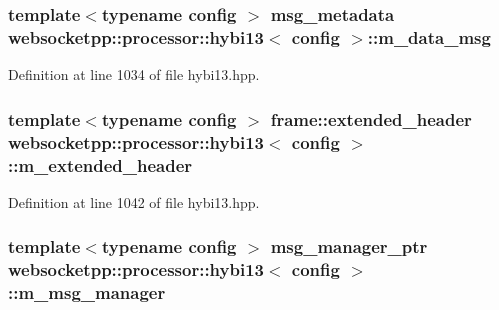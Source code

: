 \hypertarget{classwebsocketpp_1_1processor_1_1hybi13_a7ace361da2e05291aeb029956f20aee3}{}
\subsubsection[{m\+\_\+data\+\_\+msg}]{\setlength{\rightskip}{0pt plus 5cm}template$<$typename config $>$ {\bf msg\+\_\+metadata} {\bf websocketpp\+::processor\+::hybi13}$<$ config $>$\+::m\+\_\+data\+\_\+msg\hspace{0.3cm}{\ttfamily [protected]}}\label{classwebsocketpp_1_1processor_1_1hybi13_a7ace361da2e05291aeb029956f20aee3}


Definition at line 1034 of file hybi13.\+hpp.

\hypertarget{classwebsocketpp_1_1processor_1_1hybi13_a7d11d41110cd4b4e746a55ecd9faaaf1}{}
\subsubsection[{m\+\_\+extended\+\_\+header}]{\setlength{\rightskip}{0pt plus 5cm}template$<$typename config $>$ {\bf frame\+::extended\+\_\+header} {\bf websocketpp\+::processor\+::hybi13}$<$ config $>$\+::m\+\_\+extended\+\_\+header\hspace{0.3cm}{\ttfamily [protected]}}\label{classwebsocketpp_1_1processor_1_1hybi13_a7d11d41110cd4b4e746a55ecd9faaaf1}


Definition at line 1042 of file hybi13.\+hpp.

\hypertarget{classwebsocketpp_1_1processor_1_1hybi13_a023029768eda304f37698bf63aaa7fdc}{}
\subsubsection[{m\+\_\+msg\+\_\+manager}]{\setlength{\rightskip}{0pt plus 5cm}template$<$typename config $>$ {\bf msg\+\_\+manager\+\_\+ptr} {\bf websocketpp\+::processor\+::hybi13}$<$ config $>$\+::m\+\_\+msg\+\_\+manager\hspace{0.3cm}{\ttfamily [protected]}}\label{classwebsocketpp_1_1processor_1_1hybi13_a023029768eda304f37698bf63aaa7fdc}


